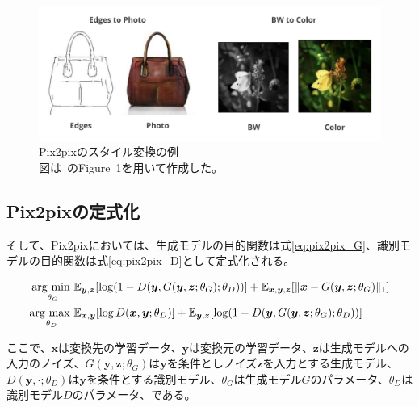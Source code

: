 \clearpage

\begin{figure}[t]
\begin{center}
\includegraphics[width=\hsize]{figure/pix2pix_img.png}
\caption{Pix2pixのスタイル変換の例\\
図は~\cite{pix2pix}のFigure~1を用いて作成した。}
\label{fig:pix2pix_img}
\end{center}
\end{figure}

\subsection{Pix2pixの定式化}

そして、Pix2pixにおいては、生成モデルの目的関数は式\ref{eq:pix2pix_G}、識別モデルの目的関数は式\ref{eq:pix2pix_D}として定式化される。

\begin{align}
    \label{eq:pix2pix_G}
    \mathop{\rm arg~min~}\limits _{\theta_G}& \mathbb{E}_{\boldsymbol{y}, \boldsymbol{z}}[\log (1-D(\boldsymbol{y}, G(\boldsymbol{y}, \boldsymbol{z}; \theta_G); \theta_D))]+\mathbb{E}_{\boldsymbol{x}, \boldsymbol{y}, \boldsymbol{z}}[\|\boldsymbol{x}-G(\boldsymbol{y}, \boldsymbol{z}; \theta_G)\|_{1}]\\
    \label{eq:pix2pix_D}
    \mathop{\rm arg~max~}\limits _{\theta_D}& \mathbb{E}_{\boldsymbol{x}, \boldsymbol{y}}[\log D(\boldsymbol{x}, \boldsymbol{y}; \theta_D)]+\mathbb{E}_{\boldsymbol{y}, \boldsymbol{z}}[\log (1-D(\boldsymbol{y}, G(\boldsymbol{y}, \boldsymbol{z}; \theta_G); \theta_D))]
\end{align}

ここで、$\boldsymbol{x}$は変換先の学習データ、$\boldsymbol{y}$は変換元の学習データ、$\boldsymbol{z}$は生成モデルへの入力のノイズ、$G(\boldsymbol{y},\boldsymbol{z};\theta_G)$は$\boldsymbol{y}$を条件としノイズ$\boldsymbol{z}$を入力とする生成モデル、$D(\boldsymbol{y},\cdot;\theta_D)$は$\boldsymbol{y}$を条件とする識別モデル、$\theta_G$は生成モデル$G$のパラメータ、$\theta_D$は識別モデル$D$のパラメータ、である。

